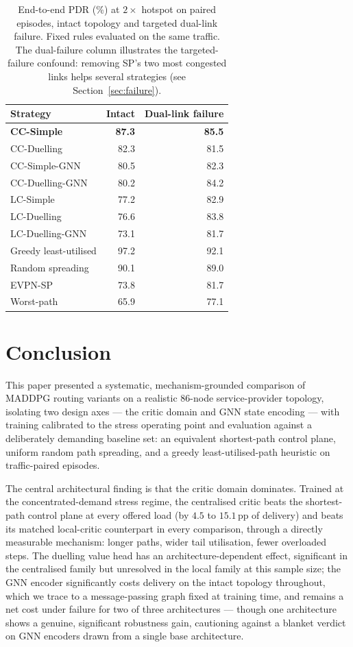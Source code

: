 \documentclass[10pt,journal,comsoc]{IEEEtran}
\begin{document}
\begin{table}[!t]
  \centering
  \caption{End-to-end PDR (\%) at $2\times$ hotspot on paired episodes, intact topology and targeted dual-link failure. Fixed rules evaluated on the same traffic. The dual-failure column illustrates the targeted-failure confound: removing SP's two most congested links helps several strategies (see Section~\ref{sec:failure}).}
  \label{tab:master}
  \small
  \begin{tabular}{lrr}
    \toprule
    Strategy & Intact & Dual-link failure \\
    \midrule
    \textbf{CC-Simple} & \textbf{87.3} & \textbf{85.5} \\
    CC-Duelling      & 82.3 & 81.5 \\
    CC-Simple-GNN    & 80.5 & 82.3 \\
    CC-Duelling-GNN  & 80.2 & 84.2 \\
    LC-Simple        & 77.2 & 82.9 \\
    LC-Duelling      & 76.6 & 83.8 \\
    LC-Duelling-GNN  & 73.1 & 81.7 \\
    \midrule
    Greedy least-utilised & 97.2 & 92.1 \\
    Random spreading & 90.1 & 89.0 \\
    EVPN-SP          & 73.8 & 81.7 \\
    Worst-path       & 65.9 & 77.1 \\
    \bottomrule
  \end{tabular}
\end{table}

\section{Conclusion}\label{conclusion}
This paper presented a systematic, mechanism-grounded comparison of MADDPG routing variants on a realistic 86-node service-provider topology, isolating two design axes --- the critic domain and GNN state encoding --- with training calibrated to the stress operating point and evaluation against a deliberately demanding baseline set: an equivalent shortest-path control plane, uniform random path spreading, and a greedy least-utilised-path heuristic on traffic-paired episodes.

The central architectural finding is that the critic domain dominates. Trained at the concentrated-demand stress regime, the centralised critic beats the shortest-path control plane at every offered load (by $4.5$ to $15.1$\,pp of delivery) and beats its matched local-critic counterpart in every comparison, through a directly measurable mechanism: longer paths, wider tail utilisation, fewer overloaded steps. The duelling value head has an architecture-dependent effect, significant in the centralised family but unresolved in the local family at this sample size; the GNN encoder significantly costs delivery on the intact topology throughout, which we trace to a message-passing graph fixed at training time, and remains a net cost under failure for two of three architectures --- though one architecture shows a genuine, significant robustness gain, cautioning against a blanket verdict on GNN encoders drawn from a single base architecture.
\end{document}
